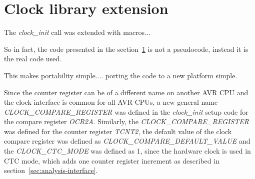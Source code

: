 
\section{Clock library extension}
The {\it{clock\_init}} call was extended with macros...

So in fact, the code presented in the section~\ref{}
is not a pseudocode, instead it is the real code used.

This makes portability simple.... porting the code to a new platform simple.


Since the counter register can be of a different name on another AVR CPU
and the clock interface is common for all AVR CPUs,
a new general name {\it{CLOCK\_COMPARE\_REGISTER}} was defined in the {\it{clock\_init}} setup code
for the compare register {\it{OCR2A}}.
Similarly, the {\it{CLOCK\_COMPARE\_REGISTER}} was defined for the counter register {\it{TCNT2}},
the default value of the clock compare register was defined as {\it{CLOCK\_COMPARE\_DEFAULT\_VALUE}}
and the {\it{CLOCK\_CTC\_MODE}} was defined as 1, since the hardware clock is used in CTC mode,
which adds one counter register increment as described in section~\ref{sec:analysis-interface}.
